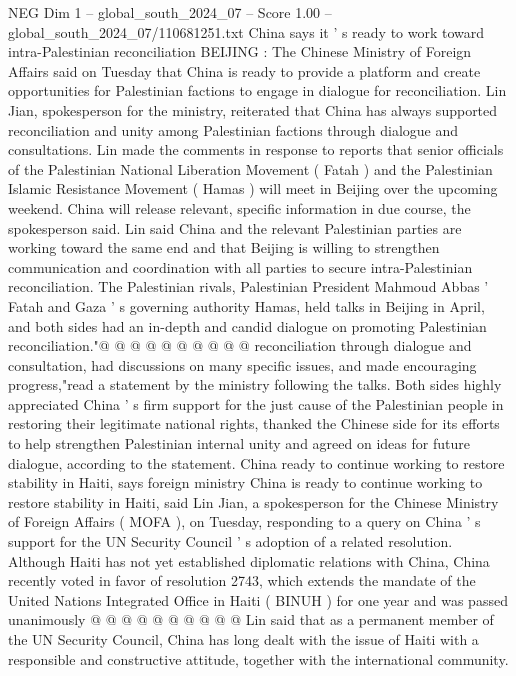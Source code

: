 \begin{textsample}{NEG Dim 1 – global\_south\_2024\_07 – Score 1.00 – global\_south\_2024\_07/110681251.txt}  \label{ex:f1_neg_271}
China says it ' s ready to work toward intra-Palestinian reconciliation BEIJING : The Chinese Ministry of Foreign Affairs said on Tuesday that China is ready to provide a platform and create opportunities for Palestinian factions to engage in dialogue for reconciliation.
Lin Jian, spokesperson for the ministry, reiterated that China has always supported reconciliation and unity among Palestinian factions through dialogue and consultations.
Lin made the comments in response to reports that senior officials of the Palestinian National Liberation Movement ( Fatah ) and the Palestinian Islamic Resistance Movement ( Hamas ) will meet in Beijing over the upcoming weekend.
China will release relevant, specific information in due course, the spokesperson said.
Lin said China and the relevant Palestinian parties are working toward the same end and that Beijing is willing to strengthen communication and coordination with all parties to secure intra-Palestinian reconciliation.
The Palestinian rivals, Palestinian President Mahmoud Abbas ' Fatah and Gaza ' s governing authority Hamas, held talks in Beijing in April, and both sides had an in-depth and candid dialogue on promoting Palestinian reconciliation."@ @ @ @ @ @ @ @ @ @ reconciliation through dialogue and consultation, had discussions on many specific issues, and made encouraging progress,"read a statement by the ministry following the talks.
Both sides highly appreciated China ' s firm support for the just cause of the Palestinian people in restoring their legitimate national rights, thanked the Chinese side for its efforts to help strengthen Palestinian internal unity and agreed on ideas for future dialogue, according to the statement.
China ready to continue working to restore stability in Haiti, says foreign ministry China is ready to continue working to restore stability in Haiti, said Lin Jian, a spokesperson for the Chinese Ministry of Foreign Affairs ( MOFA ), on Tuesday, responding to a query on China ' s support for the UN Security Council ' s adoption of a related resolution.
Although Haiti has not yet established diplomatic relations with China, China recently voted in favor of resolution 2743, which extends the mandate of the United Nations Integrated Office in Haiti ( BINUH ) for one year and was passed unanimously @ @ @ @ @ @ @ @ @ @ Lin said that as a permanent member of the UN Security Council, China has long dealt with the issue of Haiti with a responsible and constructive attitude, together with the international community.

\end{textsample}
